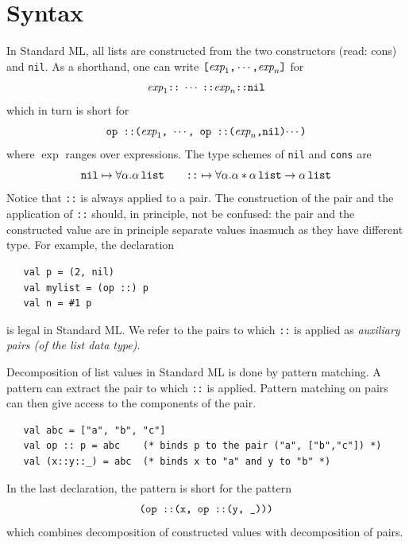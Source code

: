 \documentclass[12pt]{book}
\begin{document}
\section{Syntax}
\label{lsyn.sec}
In Standard ML, all lists are constructed 
from the two constructors 
%
\boxml{::} (read: cons) and 
%
{\tt nil}.  As a shorthand, one can write
$\hbox{\tt [}\hbox{\it exp}_1\hbox{\tt ,}\cdots \hbox{\tt ,}\hbox{\it exp}_n\hbox{\tt ]}$ for
$$ \hbox{\it exp}_1\hbox{\tt ::}\; \cdots\; \hbox{\tt ::} \hbox{\it exp}_n\hbox{\tt ::}\hbox{\tt nil}$$
which in turn is short for
$$
\hbox{\tt op ::($\hbox{\it exp}_1$, $\cdots$, op ::($\hbox{\it exp}_n$,nil)$\cdots$)}$$
where $\exp$ ranges over expressions.  The type schemes of {\tt nil}
and {\tt cons} are
$$\hbox{\tt nil}\mapsto\forall\alpha.\alpha\,\hbox{\tt list}\qquad
\hbox{\tt ::} \mapsto\forall\alpha.\alpha\ast\alpha\,\hbox{\tt list}\to\alpha\,\hbox{\tt list}
$$
Notice that {\tt ::} is always applied to a pair. The construction
of the pair and the application of {\tt ::} should, in principle, not
be confused: the pair and the constructed value are in principle
separate values inasmuch as they have different type.  For example,
the declaration
\begin{verbatim}
   val p = (2, nil)
   val mylist = (op ::) p
   val n = #1 p
\end{verbatim}
is legal in Standard ML. We refer to the pairs to which {\tt ::} is
applied as 
%
{\em auxiliary pairs (of the list data type)}.

Decomposition of list values in Standard ML is done by 
%
pattern matching.  A pattern can extract the pair to which {\tt ::} is
applied. Pattern matching on pairs can then give access to the
components of the pair.
\begin{verbatim}
   val abc = ["a", "b", "c"]
   val op :: p = abc    (* binds p to the pair ("a", ["b","c"]) *)
   val (x::y::_) = abc  (* binds x to "a" and y to "b" *)
\end{verbatim}
In the last declaration, the pattern  is short for
the pattern
$$\hbox{\tt (op ::(x, op ::(y, \_)))}$$
which combines decomposition of
constructed values with decomposition of pairs.
\end{document}
